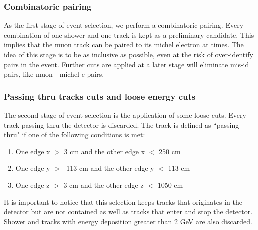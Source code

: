 \documentclass[a4paper, 10pt]{article}
\begin{document}
\subsubsection{Combinatoric pairing}
As the first stage of event selection, we perform a combinatoric pairing. Every combination of one shower and one track is kept as a preliminary candidate. This implies that the muon track can be paired to its michel electron at times. The idea of this stage is to be as inclusive as possible, even at the risk of over-identify pairs in the event. Further cuts are applied at a later stage will eliminate mis-id pairs, like muon - michel e pairs.

\subsubsection{Passing thru tracks cuts and loose energy cuts}
The second stage of event selection is the application of some  loose cuts. Every track passing thru the detector is discarded.
The track is defined as ``passing thru"  if one of the following conditions is met:
\begin{enumerate}[topsep=10pt,itemsep=-1ex,partopsep=10pt,parsep=1ex]
\item One edge  x $>$ 3 cm       and  the other edge   x $<$  250 cm
\item One edge  y $>$ -113 cm and  the other edge   y $<$ 113 cm
\item One edge  z $>$ 3 cm       and  the other edge   z $<$ 1050 cm
\end{enumerate}
It is important to notice that this selection keeps tracks that originates in the detector but are not contained as well as tracks that enter and stop the detector. 
Shower and tracks with energy deposition greater than 2 GeV are also discarded. 
\end{document}

